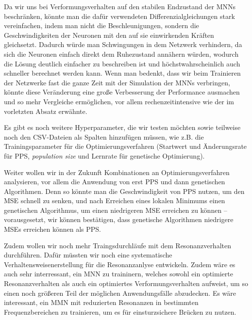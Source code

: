 \documentclass[10pt]{scrartcl}
\newcommand*{\eng}[1]{\textit{#1}}
\begin{document}
Da wir uns bei Verformungsverhalten auf den stabilen Endzustand der MNNs beschränken, könnte man die dafür verwendeten Differenzialgleichungen stark vereinfachen, indem man nicht die Beschleunigungen, sondern die Geschwindigkeiten der Neuronen mit den auf sie einwirkenden Kräften gleichsetzt.
Dadurch würde man Schwingungen in dem Netzwerk verhindern, da sich die Neuronen einfach direkt dem Ruhezustand annähern würden, wodurch die Lösung deutlich einfacher zu beschreiben ist und höchstwahrscheinlich auch schneller berechnet werden kann. 
Wenn man bedenkt, dass wir beim Trainieren der Netzwerke fast die ganze Zeit mit der Simulation der MNNs verbringen, könnte diese Veränderung eine große Verbesserung der Performance ausmachen und so mehr Vergleiche ermöglichen, vor allem rechenzeitintensive wie der im vorletzten Absatz erwähnte.


Es gibt es noch weitere Hyperparameter, die wir testen möchten sowie teilweise noch den CSV-Dateien als Spalten hinzufügen müssen, wie z.B. die Trainingsparameter für die Optimierungsverfahren (Startwert und Änderungsrate für PPS, \eng{population size} und Lernrate für genetische Optimierung).

Weiter wollen wir in der Zukunft Kombinationen an Optimierungsverfahren analysieren, vor allem die Anwendung von erst PPS und dann genetischen Algorithmen.
Denn so könnte man die Geschwindigkeit von PPS nutzen, um den MSE schnell zu senken, und nach Erreichen eines lokalen Minimums einen genetischen Algorithmus, um einen niedrigeren MSE erreichen zu können -- vorausgesetzt, wir können bestätigen, dass genetische Algorithmen niedrigere MSEs erreichen können als PPS. 

Zudem wollen wir noch mehr Traingsdurchläufe mit dem Resonanzverhalten durchführen. Dafür müssten wir noch eine systematische Verhaltensweisenerstellung für die Resonanzanlyse entwickeln. Zudem wäre es auch sehr interressant, ein MNN zu traininern, welches sowohl ein optimierte Resonanzverhalten als auch ein optimiertes Verformungsverhalten aufweist, um so einen noch größeren Teil der möglichen Anwendungsfälle abzudecken.
Es wäre interessant, ein MMN mit reduzierten Resonanzen in bestimmten Frequenzbereichen zu trainieren, um es für einsturzsichere Brücken zu nutzen.
\end{document}
